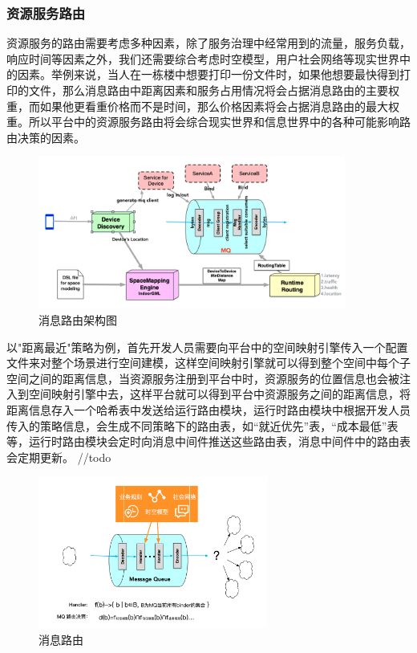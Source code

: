 \documentclass[a4paper, 12pt]{article}
\theoremstyle{definition}
\begin{document}
\subsubsection{资源服务路由}
资源服务的路由需要考虑多种因素，除了服务治理中经常用到的流量，服务负载，响应时间等因素之外，我们还需要综合考虑时空模型，用户社会网络等现实世界中的因素。举例来说，当人在一栋楼中想要打印一份文件时，如果他想要最快得到打印的文件，那么消息路由中距离因素和服务占用情况将会占据消息路由的主要权重，而如果他更看重价格而不是时间，那么价格因素将会占据消息路由的最大权重。所以平台中的资源服务路由将会综合现实世界和信息世界中的各种可能影响路由决策的因素。
\begin{figure}[ht]
 \centering
 \includegraphics[height=5cm]{images/routing_1.png}
 \caption{消息路由架构图}
 \label{fig:singleblock}
\end{figure}
以"距离最近"策略为例，首先开发人员需要向平台中的空间映射引擎传入一个配置文件来对整个场景进行空间建模，这样空间映射引擎就可以得到整个空间中每个子空间之间的距离信息，当资源服务注册到平台中时，资源服务的位置信息也会被注入到空间映射引擎中去，这样平台就可以得到平台中资源服务之间的距离信息，将距离信息存入一个哈希表中发送给运行路由模块，运行时路由模块中根据开发人员传入的策略信息，会生成不同策略下的路由表，如“就近优先”表，“成本最低”表等，运行时路由模块会定时向消息中间件推送这些路由表，消息中间件中的路由表会定期更新。
//todo
\begin{figure}[ht]
 \centering
 \includegraphics[height=5cm]{images/routing.png}
 \caption{消息路由}
 \label{fig:singleblock}
\end{figure}

\newpage

\newpage


\end{document}
